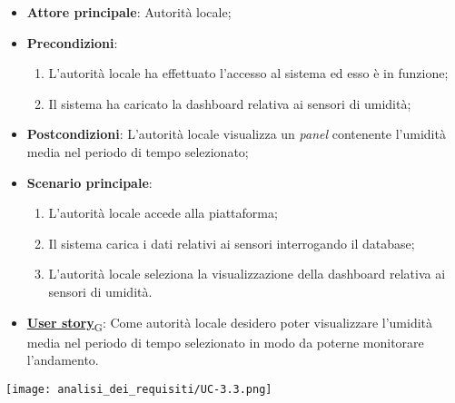 \begin{itemize}
	\item \textbf{Attore principale}: Autorità locale;
	\item \textbf{Precondizioni}:
	      \begin{enumerate}
		      \item L'autorità locale ha effettuato l'accesso al sistema ed esso è in funzione;
		      \item Il sistema ha caricato la dashboard relativa ai sensori di umidità;
	      \end{enumerate}
	\item \textbf{Postcondizioni}: L'autorità locale visualizza un \textit{panel} contenente l'umidità media nel periodo di tempo selezionato;
	\item \textbf{Scenario principale}:
	      \begin{enumerate}
		      \item L'autorità locale accede alla piattaforma;
		      \item Il sistema carica i dati relativi ai sensori interrogando il database;
		      \item L'autorità locale seleziona la visualizzazione della dashboard relativa ai sensori di umidità.
	      \end{enumerate}
	\item \href{https://7last.github.io/docs/rtb/documentazione-interna/glossario\#user-story}{\textbf{User story}\textsubscript{G}}: Come autorità locale desidero poter visualizzare l'umidità media nel periodo di tempo selezionato
	      in modo da poterne monitorare l'andamento.
\end{itemize}
\begin{center}
	\texttt{[image: analisi\_dei\_requisiti/UC-3.3.png]}
\end{center}

